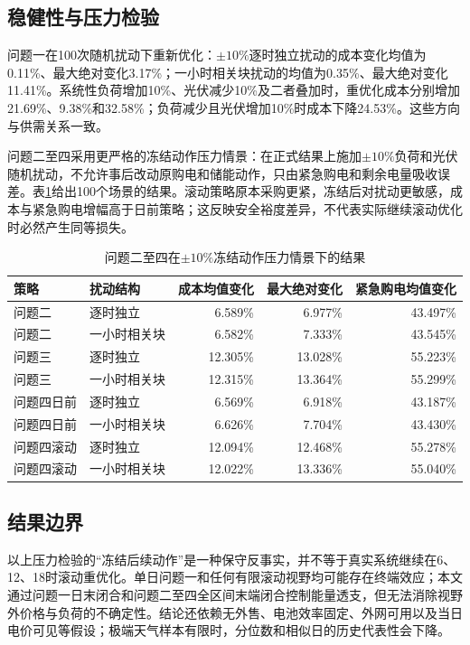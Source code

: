 \documentclass[UTF8,a4paper,12pt,fontset=fandol]{ctexart}
\numberwithin{equation}{section}
\begin{document}
\subsection{稳健性与压力检验}

问题一在100次随机扰动下重新优化：$\pm10\%$逐时独立扰动的成本变化均值为0.11\%、最大绝对变化3.17\%；一小时相关块扰动的均值为0.35\%、最大绝对变化11.41\%。系统性负荷增加10\%、光伏减少10\%及二者叠加时，重优化成本分别增加21.69\%、9.38\%和32.58\%；负荷减少且光伏增加10\%时成本下降24.53\%。这些方向与供需关系一致。

问题二至四采用更严格的冻结动作压力情景：在正式结果上施加$\pm10\%$负荷和光伏随机扰动，不允许事后改动原购电和储能动作，只由紧急购电和剩余电量吸收误差。表\ref{tab:stress-checks}给出100个场景的结果。滚动策略原本采购更紧，冻结后对扰动更敏感，成本与紧急购电增幅高于日前策略；这反映安全裕度差异，不代表实际继续滚动优化时必然产生同等损失。

\begin{table}[htbp]
\centering
\scriptsize
\caption{问题二至四在$\pm10\%$冻结动作压力情景下的结果}\label{tab:stress-checks}
\begin{tabular}{llrrr}
\toprule
策略 & 扰动结构 & 成本均值变化 & 最大绝对变化 & 紧急购电均值变化\\
\midrule
问题二 & 逐时独立 & 6.589\% & 6.977\% & 43.497\%\\
问题二 & 一小时相关块 & 6.582\% & 7.333\% & 43.545\%\\
问题三 & 逐时独立 & 12.305\% & 13.028\% & 55.223\%\\
问题三 & 一小时相关块 & 12.315\% & 13.364\% & 55.299\%\\
问题四日前 & 逐时独立 & 6.569\% & 6.918\% & 43.187\%\\
问题四日前 & 一小时相关块 & 6.626\% & 7.704\% & 43.430\%\\
问题四滚动 & 逐时独立 & 12.094\% & 12.468\% & 55.278\%\\
问题四滚动 & 一小时相关块 & 12.022\% & 13.336\% & 55.040\%\\
\bottomrule
\end{tabular}
\end{table}

\subsection{结果边界}

以上压力检验的“冻结后续动作”是一种保守反事实，并不等于真实系统继续在6、12、18时滚动重优化。单日问题一和任何有限滚动视野均可能存在终端效应；本文通过问题一日末闭合和问题二至四全区间末端闭合控制能量透支，但无法消除视野外价格与负荷的不确定性。结论还依赖无外售、电池效率固定、外网可用以及当日电价可见等假设；极端天气样本有限时，分位数和相似日的历史代表性会下降。
\end{document}
